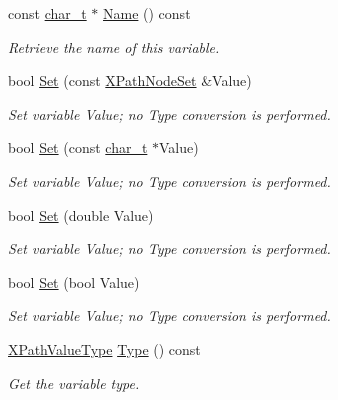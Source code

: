 \begin{DoxyCompactItemize}
const \hyperlink{namespacephys_1_1xml_afc87705cd1c2917d87b879715a2d8f6e}{char\_\-t} $\ast$ \hyperlink{classphys_1_1xml_1_1XPathVariable_adeecf4d048c98de6fe7e9fcdb7174bcc}{Name} () const 
\begin{DoxyCompactList}\small\item\em Retrieve the name of this variable. \item\end{DoxyCompactList}\item 
bool \hyperlink{classphys_1_1xml_1_1XPathVariable_a121079abb73e70ade34f4e69181e5694}{Set} (const \hyperlink{classphys_1_1xml_1_1XPathNodeSet}{XPathNodeSet} \&Value)
\begin{DoxyCompactList}\small\item\em Set variable Value; no Type conversion is performed. \item\end{DoxyCompactList}\item 
bool \hyperlink{classphys_1_1xml_1_1XPathVariable_acf825ac8cd7dd20fc6f1c9fd7bb997fe}{Set} (const \hyperlink{namespacephys_1_1xml_afc87705cd1c2917d87b879715a2d8f6e}{char\_\-t} $\ast$Value)
\begin{DoxyCompactList}\small\item\em Set variable Value; no Type conversion is performed. \item\end{DoxyCompactList}\item 
bool \hyperlink{classphys_1_1xml_1_1XPathVariable_abb5f6da9b731d770e1a34ee9981b22be}{Set} (double Value)
\begin{DoxyCompactList}\small\item\em Set variable Value; no Type conversion is performed. \item\end{DoxyCompactList}\item 
bool \hyperlink{classphys_1_1xml_1_1XPathVariable_aea78a6ac9a12a1be68db8a56fbffebc3}{Set} (bool Value)
\begin{DoxyCompactList}\small\item\em Set variable Value; no Type conversion is performed. \item\end{DoxyCompactList}\item 
\hyperlink{namespacephys_1_1xml_a339b9eef674ba44100110e5524bc575d}{XPathValueType} \hyperlink{classphys_1_1xml_1_1XPathVariable_a6c2986292fe674b79ea9dbf261c4a96f}{Type} () const 
\begin{DoxyCompactList}\small\item\em Get the variable type. \item\end{DoxyCompactList}\end{DoxyCompactItemize}

